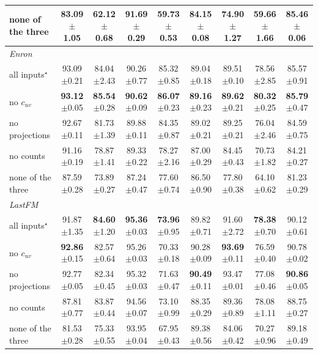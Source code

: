 \begin{table}[p]
\begin{tabular}{lcccccccc}
none of the three & 83.09{\tiny$\pm$1.05} & 62.12{\tiny$\pm$0.68} & 91.69{\tiny$\pm$0.29} & 59.73{\tiny$\pm$0.53} & 84.15{\tiny$\pm$0.08} & 74.90{\tiny$\pm$1.27} & 59.66{\tiny$\pm$1.66} & 85.46{\tiny$\pm$0.06} \\
\midrule
\multicolumn{9}{l}{\textit{Enron}} \\
all inputs$^\star$ & 93.09{\tiny$\pm$0.21} & 84.04{\tiny$\pm$2.43} & 90.26{\tiny$\pm$0.77} & 85.32{\tiny$\pm$0.85} & 89.04{\tiny$\pm$0.18} & 89.51{\tiny$\pm$0.10} & 78.56{\tiny$\pm$2.85} & 85.57{\tiny$\pm$0.91} \\
no $c_{uv}$ & \textbf{93.12}{\tiny$\pm$0.05} & \textbf{85.54}{\tiny$\pm$0.28} & \textbf{90.62}{\tiny$\pm$0.09} & \textbf{86.07}{\tiny$\pm$0.23} & \textbf{89.16}{\tiny$\pm$0.23} & \textbf{89.62}{\tiny$\pm$0.21} & \textbf{80.32}{\tiny$\pm$0.25} & \textbf{85.79}{\tiny$\pm$0.47} \\
no projections & 92.67{\tiny$\pm$0.11} & 81.73{\tiny$\pm$1.39} & 89.88{\tiny$\pm$0.11} & 84.35{\tiny$\pm$0.87} & 89.02{\tiny$\pm$0.21} & 89.25{\tiny$\pm$0.21} & 76.04{\tiny$\pm$2.46} & 84.59{\tiny$\pm$0.75} \\
no counts & 91.16{\tiny$\pm$0.19} & 78.87{\tiny$\pm$1.41} & 89.33{\tiny$\pm$0.22} & 78.27{\tiny$\pm$2.16} & 87.00{\tiny$\pm$0.29} & 84.45{\tiny$\pm$0.43} & 70.73{\tiny$\pm$1.82} & 84.21{\tiny$\pm$0.27} \\
none of the three & 87.59{\tiny$\pm$0.28} & 73.89{\tiny$\pm$0.27} & 87.24{\tiny$\pm$0.47} & 77.60{\tiny$\pm$0.74} & 86.50{\tiny$\pm$0.90} & 77.80{\tiny$\pm$0.38} & 64.10{\tiny$\pm$0.62} & 81.23{\tiny$\pm$0.29} \\
\midrule
\multicolumn{9}{l}{\textit{LastFM}} \\
all inputs$^\star$ & 91.87{\tiny$\pm$1.35} & \textbf{84.60}{\tiny$\pm$1.20} & \textbf{95.36}{\tiny$\pm$0.03} & \textbf{73.96}{\tiny$\pm$0.95} & 89.82{\tiny$\pm$0.71} & 91.60{\tiny$\pm$2.72} & \textbf{78.38}{\tiny$\pm$0.70} & 90.12{\tiny$\pm$0.61} \\
no $c_{uv}$ & \textbf{92.86}{\tiny$\pm$0.15} & 82.57{\tiny$\pm$0.64} & 95.26{\tiny$\pm$0.03} & 70.33{\tiny$\pm$0.18} & 90.28{\tiny$\pm$0.09} & \textbf{93.69}{\tiny$\pm$0.11} & 76.59{\tiny$\pm$0.40} & 90.78{\tiny$\pm$0.02} \\
no projections & 92.77{\tiny$\pm$0.05} & 82.34{\tiny$\pm$0.45} & 95.32{\tiny$\pm$0.03} & 71.63{\tiny$\pm$0.47} & \textbf{90.49}{\tiny$\pm$0.11} & 93.47{\tiny$\pm$0.01} & 77.08{\tiny$\pm$0.46} & \textbf{90.86}{\tiny$\pm$0.05} \\
no counts & 87.81{\tiny$\pm$0.77} & 83.87{\tiny$\pm$0.44} & 94.56{\tiny$\pm$0.07} & 73.10{\tiny$\pm$0.99} & 88.35{\tiny$\pm$0.29} & 89.36{\tiny$\pm$0.89} & 78.08{\tiny$\pm$1.11} & 88.75{\tiny$\pm$0.27} \\
none of the three & 81.53{\tiny$\pm$0.28} & 75.33{\tiny$\pm$0.55} & 93.95{\tiny$\pm$0.04} & 67.95{\tiny$\pm$0.43} & 89.38{\tiny$\pm$0.56} & 84.06{\tiny$\pm$0.42} & 70.27{\tiny$\pm$0.96} & 89.18{\tiny$\pm$0.49} \\
\bottomrule
\end{tabular}
\end{table}
